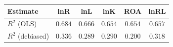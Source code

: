 \begin{tabular}{l*{5}{c}}
\hline\hline
 Estimate & lnR & lnL & lnK & ROA & lnRL \\
\hline
\addlinespace $ R^2$ (OLS) & $0.684$ & $0.666$ & $0.654$ & $0.654$ & $0.657$ \\
$ R^2$ (debiased) & $0.336$ & $0.289$ & $0.290$ & $0.200$ & $0.318$ \\
\hline\hline
\end{tabular}
